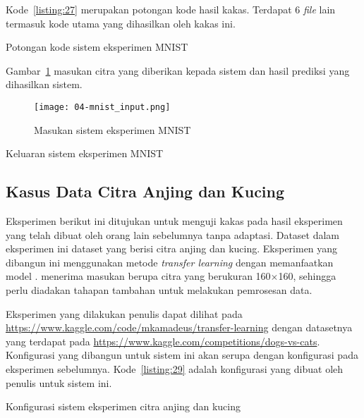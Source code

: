 Kode~\ref{listing:27} merupakan potongan kode hasil kakas.
Terdapat 6 \textit{file} lain termasuk kode utama yang dihasilkan oleh kakas ini.

\begin{code}
	\caption{Potongan kode sistem eksperimen MNIST}\label{listing:27}
\end{code}

Gambar~\ref{fig:04-mnist-input} masukan citra yang diberikan kepada sistem dan hasil prediksi yang dihasilkan sistem.

\begin{figure}[ht]
  \vspace{\baselineskip}
    \centering
    \texttt{[image: 04-mnist\_input.png]}
    \caption{Masukan sistem eksperimen MNIST}\label{fig:04-mnist-input}
\end{figure}

\begin{code}
	\caption{Keluaran sistem eksperimen MNIST}\label{listing:28}
\end{code}

\subsection{Kasus Data Citra Anjing dan Kucing}

Eksperimen berikut ini ditujukan untuk menguji kakas pada hasil eksperimen yang telah dibuat oleh orang lain sebelumnya tanpa adaptasi.
Dataset dalam eksperimen ini dataset yang berisi citra anjing dan kucing.
Eksperimen yang dibangun ini menggunakan metode \textit{transfer learning} dengan memanfaatkan model .
 menerima masukan berupa citra yang berukuran 160\(\times\)160, sehingga perlu diadakan tahapan tambahan untuk melakukan pemrosesan data.

Eksperimen yang dilakukan penulis dapat dilihat pada \url{https://www.kaggle.com/code/mkamadeus/transfer-learning} dengan datasetnya yang terdapat pada \url{https://www.kaggle.com/competitions/dogs-vs-cats}.
Konfigurasi yang dibangun untuk sistem ini akan serupa dengan konfigurasi pada eksperimen sebelumnya.
Kode~\ref{listing:29} adalah konfigurasi yang dibuat oleh penulis untuk sistem ini.

\begin{code}
	\caption{Konfigurasi sistem eksperimen citra anjing dan kucing}\label{listing:29}
\end{code}

